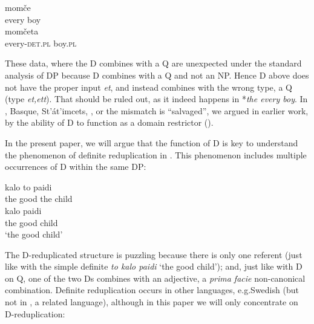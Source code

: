 \documentclass[output=paper,
modfonts
]{langscibook}
\begin{document}
\ea\label{ex:etxeberria:12}
 \citep{schurcks2014}
\ea\label{ex:etxeberria:12a}
 {momče}\\
every boy\\
\ex\label{ex:etxeberria:12b}
 {momčeta}\\
every-\textsc{det.pl} boy.\textsc{pl}\\
\z
\z

These data, where the D combines with a Q are unexpected under the standard analysis of DP because D combines with a Q and not an NP. Hence D above does not have the proper input \textit{et}, and instead combines with the wrong type, a Q (type \textit{et,ett}). That should be ruled out, as it indeed happens in  *\textit{the every boy}. In , Basque, St'\'at'imcets, , or  the mismatch is ``salvaged'', we argued in earlier work, by the ability of D to function as a domain restrictor (\citealt{Giannakidou2004, etxeberria2005, etxeberria-giannakidou2009, etxeberria-giannakidou2014}).

In the present paper, we will argue that the  function of D is key to understand the phenomenon of definite reduplication in . This phenomenon includes multiple occurrences of D within the same DP: 

\ea\label{ex:etxeberria:13}
\ea\label{ex:etxeberria:13a}
 {kalo} {to} {paidi}\\
the good the child\\
\ex\label{ex:etxeberria:13b} 
 {kalo} {paidi}\\
the good child\\
\glt `the good child'
\z
\z

The D-reduplicated structure is puzzling because there is only one referent (just like with the simple definite \textit{to kalo paidi} `the good child'); and, just like with D on Q, one of the two Ds combines with an adjective, a \textit{prima facie} non-canonical combination. Definite reduplication occurs in other languages, e.g.\linebreak{}Swedish (but not in , a related language), although in this paper we will only concentrate on  D-reduplication:
\end{document}
